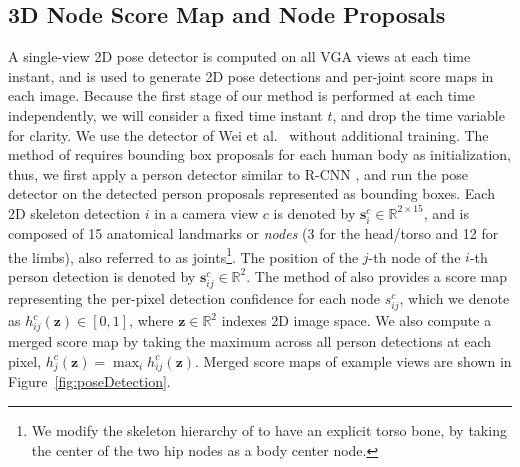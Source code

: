 

\subsection{3D Node Score Map and Node Proposals}
\label{subsection:nodeProposals}
A single-view 2D pose detector is computed on all VGA views at each time instant, and is used to generate 2D pose detections and per-joint score maps in each image. Because the first stage of our method is performed at each time independently, we will consider a fixed time instant $t$, and drop the time variable for clarity. We use the detector of Wei et al.~\cite{Wei-2016} without additional training. The method of \cite{Wei-2016} requires bounding box proposals for each human body as initialization, thus, we first apply a person detector similar to R-CNN \cite{Girshick-14}, and run the pose detector on the detected person proposals represented as bounding boxes. Each 2D skeleton detection $i$ in a camera view $c$ is denoted by $\mathbf{s}_{i}^c \in \mathds{R}^{2\times 15}$, and is composed of 15 anatomical landmarks or \emph{nodes} (3 for the head/torso and 12 for the limbs), also referred to as joints\footnote{We modify the skeleton hierarchy of \cite{Wei-2016} to have an explicit torso bone, by taking the center of the two hip nodes as a body center node.}. The position of the $j$-th node of the $i$-th person detection is denoted by $\mathbf{s}_{ij}^c \in \mathds{R}^{2}$. The method of \cite{Wei-2016} also provides a score map representing the per-pixel detection confidence for each node $s_{ij}^c$, which we denote as $h_{ij}^{c}(\mathbf{z})\in[0,1]$, where $\mathbf{z}\in \mathds{R}^2$ indexes 2D image space. We also compute a merged score map by taking the maximum across all person detections at each pixel, $h_{j}^{c}(\mathbf{z})=\max_i h_{ij}^{c}(\mathbf{z})$. Merged score maps of example views are shown in Figure~\ref{fig:poseDetection}.


